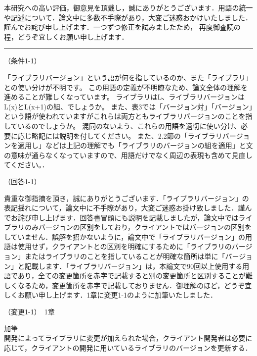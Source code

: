 \documentclass{jarticle} %
\def\subsection#1{ \vspace{1pc} {\gt #1} }
\def\nextans{ \vspace{2pc} \hrule }
\begin{document}
本研究への高い評価，御意見を頂戴し，誠にありがとうございます．用語の統一や記述について．論文中に多数不手際があり，大変ご迷惑おかけいたしました．謹んでお詫び申し上げます．一つずつ修正を試みましたため，
再度御査読の程，どうぞ宜しくお願い申し上げます．


      

\newpage
\nextans
\subsection{（条件1-1）}

「ライブラリバージョン」という語が何を指しているのか、また「ライブラリ」との使い分けが不明です。
この用語の定義が不明瞭なため、論文全体の理解を進めることが難しくなっています。
ライブラリはL、ライブラリバージョンはL(x)とL(x+1)の組、でしょうか。
また、表3では「バージョン対」「バージョン」という語が使われていますがこれらは両方ともライブラリバージョンのことを指しているのでしょうか。
混同のないよう、これらの用語を適切に使い分け、必要に応じ略記には説明を付してください。
また、2.2節の「ライブラリバージョンを適用し」などは上記の理解でも「ライブラリのバージョンの組を適用」と文の意味が通らなくなっていますので、用語だけでなく周辺の表現も含めて見直してください。．

\subsection{（回答1-1）　}

貴重な御指摘を頂き，誠にありがとうございます．「ライブラリバージョン」の表記揺れについて，論文中に不手際があり，大変ご迷惑お掛け致しました．謹んでお詫び申し上げます．回答書冒頭にも説明を記載しましたが，論文中ではライブラリのみバージョンの区別をしており，クライアントではバージョンの区別をしていません．誤解を招かないように，論文中で「ライブラリバージョン」の用語は使用せず，クライアントとの区別を明確にするために「ライブラリのバージョン」またはライブラリのことを指していることが明確な箇所は単に「バージョン」と記載します．「ライブラリバージョン」は，本論文で90回以上使用する用語であり，全ての変更箇所を赤字で記載すると別の変更箇所と区別することが難しくなるため，変更箇所を赤字で記載しておりません．御理解のほど，どうぞ宜しくお願い申し上げます．1章に変更1-1のように加筆いたしました．

\subsection{（変更1-1）　1章}
\vspace{-0.3cm}
\begin{description}
\item 加筆\\
\phantom{　}
開発によってライブラリに変更が加えられた場合，クライアント開発者は必要に応じて，クライアントの開発に用いているライブラリのバージョンを更新する\textcolor{red}{}．
\end{description}
\end{document}
